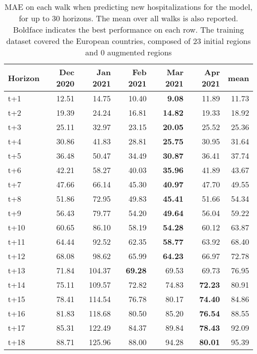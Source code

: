 \begin{table}[H]
\centering
\caption{MAE on each walk when predicting new hospitalizations for the model, for up to 30 horizons. The mean over all walks is also reported. Boldface indicates the best performance on each row. The training dataset covered the European countries, composed of 23 initial regions and 0 augmented regions }
\label{tab:MAE_walk_assembly_2}
\begin{tabular}{lrrrrrr}
\toprule
Horizon &  Dec 2020 &  Jan 2021 &  Feb 2021 &  Mar 2021 &  Apr 2021 &   mean \\
\midrule
t+1  & 12.51  & 14.75  & 10.40  & \textbf{9.08}  & 11.89  & 11.73  \\
t+2  & 19.39  & 24.24  & 16.81  & \textbf{14.82}  & 19.33  & 18.92  \\
t+3  & 25.11  & 32.97  & 23.15  & \textbf{20.05}  & 25.52  & 25.36  \\
t+4  & 30.86  & 41.83  & 28.81  & \textbf{25.75}  & 30.95  & 31.64  \\
t+5  & 36.48  & 50.47  & 34.49  & \textbf{30.87}  & 36.41  & 37.74  \\
t+6  & 42.21  & 58.27  & 40.03  & \textbf{35.96}  & 41.89  & 43.67  \\
t+7  & 47.66  & 66.14  & 45.30  & \textbf{40.97}  & 47.70  & 49.55  \\
t+8  & 51.86  & 72.95  & 49.83  & \textbf{45.41}  & 51.66  & 54.34  \\
t+9  & 56.43  & 79.77  & 54.20  & \textbf{49.64}  & 56.04  & 59.22  \\
t+10  & 60.65  & 86.10  & 58.19  & \textbf{54.28}  & 60.12  & 63.87  \\
t+11  & 64.44  & 92.52  & 62.35  & \textbf{58.77}  & 63.92  & 68.40  \\
t+12  & 68.08  & 98.62  & 65.99  & \textbf{64.23}  & 66.97  & 72.78  \\
t+13  & 71.84  & 104.37  & \textbf{69.28}  & 69.53  & 69.73  & 76.95  \\
t+14  & 75.11  & 109.57  & 72.82  & 74.83  & \textbf{72.23}  & 80.91  \\
t+15  & 78.41  & 114.54  & 76.78  & 80.17  & \textbf{74.40}  & 84.86  \\
t+16  & 81.83  & 118.68  & 80.50  & 85.20  & \textbf{76.54}  & 88.55  \\
t+17  & 85.31  & 122.49  & 84.37  & 89.84  & \textbf{78.43}  & 92.09  \\
t+18  & 88.71  & 125.96  & 88.00  & 94.28  & \textbf{80.01}  & 95.39  \\

\end{tabular}
\end{table}

